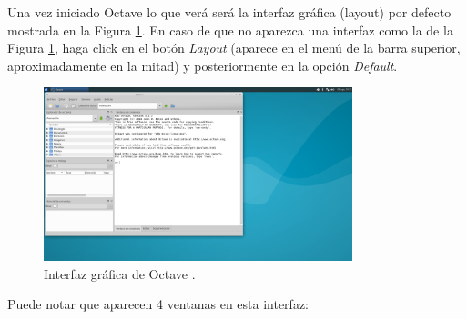 \documentclass[letter,11pt]{article}
\newcommand\0{\mathbf{0}}
\newcommand{\octave}{{\sc Octave }}
\begin{document}
\newpage

Una vez iniciado \octave{} lo que ver\'a ser\'a la interfaz gr\'afica (layout) por defecto mostrada en la Figura \ref{fig:layout_octave}. En caso de que no aparezca una interfaz como la de la Figura \ref{fig:layout_octave}, haga click en el bot\'on \emph{Layout} (aparece en el men\'u de la barra superior, aproximadamente en la mitad) y posteriormente en la opci\'on \emph{Default}.

\begin{figure}[h]
\centering
\includegraphics[width=0.8\textwidth]{layout_octave.png}
\caption{Interfaz gr\'afica de \octave.}\label{fig:layout_octave}
\end{figure}

Puede notar que aparecen 4 ventanas en esta interfaz:
\end{document}
